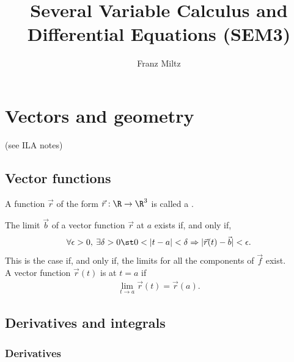\documentclass{article}
\begin{document}
\title{Several Variable Calculus and Differential Equations (SEM3)}
\author{Franz Miltz}
\maketitle
\tableofcontents
\pagebreak



\section{Vectors and geometry}



(see ILA notes)
\setcounter{subsection}{4}


\subsection{Vector functions}


\begin{definition}
    A function $\vec r$ of the form $\vec r: \R \to \R^3$ is called a .
\end{definition}
\begin{definition}
    The limit $\vec b$ of a vector function $\vec r$ at $a$ exists if, and only if,
    \begin{align*}
        \forall \epsilon > 0,\: \exists \delta > 0 \st 0 < |t-a| < \delta \Rightarrow |\vec r(t) - \vec b|<\epsilon.
    \end{align*}
    This is the case if, and only if, the limits for all the components of $\vec f$ exist.\\
    A vector function $\vec r(t)$ is  at $t=a$ if
    \begin{align*}
        \lim_{t\to a} \vec r (t) = \vec r (a). 
    \end{align*}
\end{definition}


\subsection{Derivatives and integrals}


\subsubsection{Derivatives}
\end{document}

